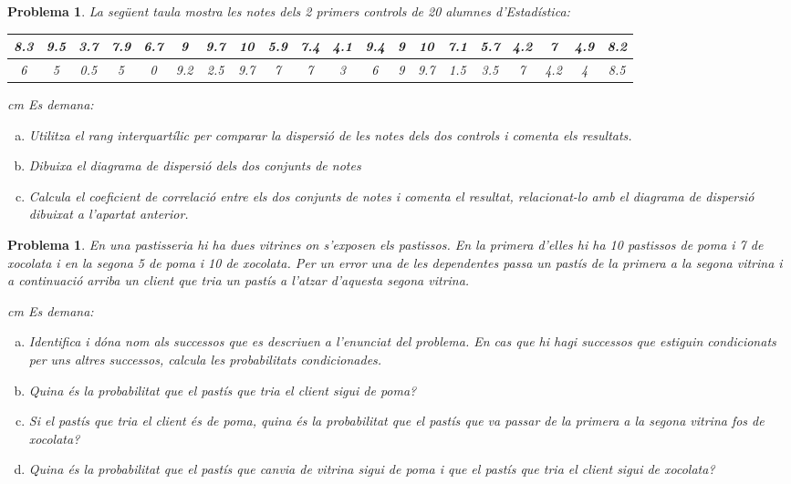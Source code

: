 \documentclass[a4paper,12pt]{article}
\newcounter{prbcont}
\newtheorem{problema}[prbcont]{Problema}
\begin{document}
\vskip 0.5cm

\begin{problema}
La següent taula mostra les notes dels 2 primers controls de 20 alumnes d'Estadística:

\begin{center}
\begin{tabular}{|cccccccccccccccccccc|}
\hline
 8.3 & 9.5 & 3.7 & 7.9 & 6.7 & 9 & 9.7 & 10 & 5.9 & 7.4 & 4.1 & 9.4 & 9 & 10 & 7.1 & 5.7 & 4.2 & 7 & 4.9 & 8.2 \\
\hline
6 & 5 & 0.5 & 5 & 0 & 9.2 & 2.5 & 9.7 & 7 & 7 & 3 & 6 & 9 & 9.7 & 1.5 & 3.5 & 7 & 4.2 & 4 & 8.5 \\
\hline
\end{tabular}
\end{center}

 cm
Es demana:

\begin{enumerate}[a)]
\item Utilitza el rang interquartílic per comparar la dispersió de les notes dels dos controls i comenta els resultats.
\item Dibuixa el diagrama de dispersió dels dos conjunts de notes
\item Calcula el coeficient de correlació entre els dos conjunts de notes i comenta el resultat, relacionat-lo amb el diagrama
de dispersió dibuixat a l'apartat anterior.
\end{enumerate}
\end{problema}

\vskip 0.5cm

\begin{problema}
En una pastisseria hi ha dues vitrines on s'exposen els pastissos. En la primera d'elles hi ha 10 pastissos de poma i 7 de xocolata
i en la segona 5 de poma i 10 de xocolata. Per un error una de les dependentes passa un pastís de la primera a la segona vitrina
i a continuació arriba un client que tria un pastís a l'atzar d'aquesta segona vitrina.


 cm
Es demana:

\begin{enumerate}[a)]
\item Identifica i dóna nom als successos que es descriuen a l'enunciat del problema.
En cas que hi hagi successos que estiguin condicionats per uns altres successos, calcula les probabilitats condicionades. 
\item Quina és la probabilitat que el pastís que tria el client sigui de poma?
\item Si el pastís que tria el client és de poma, quina és la probabilitat que el pastís que va passar de la primera a la segona 
vitrina fos de xocolata?
\item Quina és la probabilitat que el pastís que canvia de vitrina sigui de poma i que el pastís que tria el client sigui de xocolata?
\end{enumerate}
\end{problema}
\end{document}
